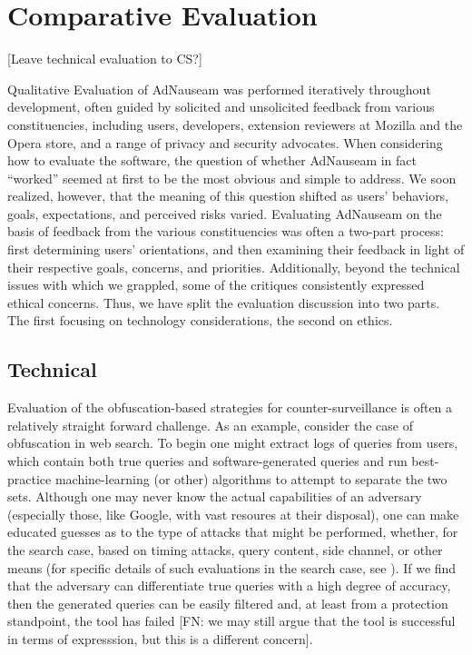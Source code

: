 \documentclass[conference]{IEEEtran}
\begin{document}
\section{Comparative Evaluation}

[Leave technical evaluation to CS?]

Qualitative Evaluation of AdNauseam was performed iteratively throughout development, often guided by solicited and unsolicited feedback from various constituencies, including users, developers, extension reviewers at Mozilla and the Opera store, and a range of privacy and security advocates. When considering how to evaluate the software, the question of whether AdNauseam in fact “worked” seemed at first to be the most obvious and simple to address. We soon realized, however, that the meaning of this question shifted as users' behaviors, goals, expectations, and perceived risks varied. Evaluating AdNauseam on the basis of feedback from the various constituencies was often a two-part process: first determining users' orientations, and then examining their feedback in light of their respective goals, concerns, and priorities. Additionally, beyond the technical issues with which we grappled, some of the critiques consistently expressed ethical concerns. Thus, we have split the evaluation discussion into two parts. The first focusing on technology considerations, the second on ethics.

\subsection{Technical}

Evaluation of the obfuscation-based strategies for counter-surveillance is often a relatively straight forward challenge. As an example, consider the case of obfuscation in web search. To begin one might extract logs of queries from users, which contain both true queries and software-generated queries and run best-practice machine-learning (or other) algorithms to attempt to separate the two sets. Although one may never know the actual capabilities of an adversary (especially those, like Google, with vast resoures at their disposal), one can make educated guesses as to the type of attacks that might be performed, whether, for the search case, based on timing attacks, query content, side channel, or other means (for specific details of such evaluations in the search case, see \cite{Gervais,Balsa,Peddinti}).  If we find that the adversary can differentiate true queries with a high degree of accuracy, then the generated queries can be easily filtered  and, at least from a protection standpoint, the tool has failed [FN: we may still argue that the tool is successful in terms of expresssion, but this is a different concern].
\end{document}
